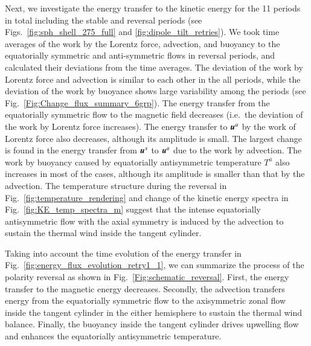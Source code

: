 Next, we investigate the energy transfer to the kinetic energy for the 11 periods in total including the stable and reversal periods (see Figs.\ \ref{fig:sph_shell_275_full} and \ref{fig:dipole_tilt_retries}).
We took time averages of the work by the Lorentz force, advection, and buoyancy to the equatorially symmetric and anti-symmetric flows in reversal periods, and calculated their deviations from the time averages.
{\color{red}
The deviation of the work by Lorentz force and advection is similar to each other in the all periods, while the deviation of the work by buoyance shows large variability among the periods (see Fig.~\ref{Fig:Change_flux_summary_6grp}).
}
The energy transfer from the equatorially symmetric flow to the magnetic field decreases (i.e.\ the deviation of the work by Lorentz force increases). 
{\color{red}
The energy transfer to $\mbox{\boldmath$u$}^a$ by the work of Lorentz force also decreases, although its amplitude is small.
}
The largest change is found in the energy transfer from $\mbox{\boldmath$u$}^s$ to $\mbox{\boldmath$u$}^a$ due to the work by advection. 
The work by buoyancy caused by equatorially antisymmetric temperature $T^{a}$ also increases in most of the cases, although its amplitude is smaller than that by the advection. 
The temperature structure during the reversal in Fig.~\ref{fig:temperature_rendering} and change of the kinetic energy spectra in Fig.~\ref{fig:KE_temp_spectra_m} suggest that the intense equatorially antisymmetric flow with the axial symmetry is induced by the advection to sustain the thermal wind inside the tangent cylinder. 

Taking into account the time evolution of the energy transfer in Fig.~\ref{fig:energy_flux_evolution_retry1_1}, we can summarize the process of the polarity reversal as shown in Fig.~\ref{Fig:schematic_reversal}. 
First, the energy transfer to the magnetic energy decreases. 
Secondly, the advection transfers energy from the equatorially symmetric flow to the axisymmetric zonal flow inside the tangent cylinder in the either hemisphere to sustain the thermal wind balance. 
Finally, the buoyancy inside the tangent cylinder drives upwelling flow and enhances the equatorially antisymmetric temperature.

